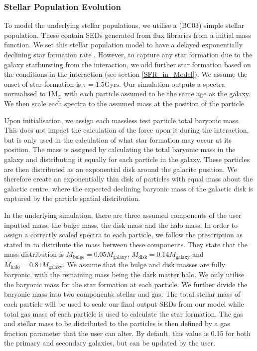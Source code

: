 \subsubsection{Stellar Population Evolution}\label{Stellar_Pop_Evol}
To model the underlying stellar populations, we utilise a \citet{2003MNRAS.344.1000B} (BC03) simple stellar population. These contain SEDs generated from flux libraries from a \citet{2003PASP..115..763C} initial mass function. We set this stellar population model to have a delayed exponentially declining star formation rate \citep{2009ApJ...690..802J, 2013ApJ...762L..15P,2014arXiv1404.0402S, 2019A&A...622A.103B}. However, to capture any star formation due to the galaxy starbursting from the interaction, we add further star formation based on the conditions in the interaction (see section \ref{SFR_in_Model}). We assume the onset of star formation is $\tau = 1.5\text{Gyrs}$. Our simulation outputs a spectra normalised to 1M$_{\odot}$ with each particle assumed to be the same age as the galaxy. We then scale each spectra to the assumed mass at the position of the particle

Upon initialisation, we assign each massless test particle total baryonic mass. This does not impact the calculation of the force upon it during the interaction, but is only used in the calculation of what star formation may occur at its position. The mass is assigned by calculating the total baryonic mass in the galaxy and distributing it equally for each particle in the galaxy. These particles are then distributed as an exponential disk around the galacitc position. We therefore create an exponentially thin disk of particles with equal mass about the galactic centre, where the expected declining baryonic mass of the galactic disk is captured by the particle spatial distribution.

In the underlying simulation, there are three assumed components of the user inputted mass: the bulge mass, the disk mass and the halo mass. In order to assign a correctly scaled spectra to each particle, we follow the prescription as stated in \citet{2016A&C....16...26W} to distribute the mass between these components. They state that the mass distribution is $M_{\text{bulge}} = 0.05M_{\text{galaxy}}$, $M_{\text{disk}} = 0.14M_{\text{galaxy}}$ and $M_{\text{halo}} = 0.81M_{\text{galaxy}}$. We assume that the bulge and disk masses are fully baryonic, with the remaining mass being the dark matter halo. We only utilise the baryonic mass for the star formation at each particle. We further divide the baryonic mass into two components: stellar and gas. The total stellar mass of each particle will be used to scale our final output SEDs from our model while total gas mass of each particle is used to calculate the star formation. The gas and stellar mass to be distributed to the particles is then defined by a gas fraction parameter that the user can alter. By default, this value is 0.15 for both the primary and secondary galaxies, but can be updated by the user.

